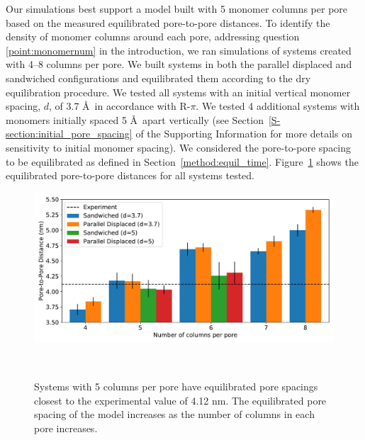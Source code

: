 \documentclass[journal=jpcbfk,manuscript=article]{achemso}
\begin{document}
  Our simulations best support a model built with 5 monomer columns per pore based on
  the measured equilibrated pore-to-pore distances. To identify the density of
  monomer columns around each pore, addressing question \ref{point:monomernum} in the introduction, we ran
  simulations of systems created with 4--8 columns per pore. We built systems in both
  the parallel displaced and sandwiched configurations and equilibrated them according
  to the dry equilibration procedure. We tested all systems with an initial vertical monomer 
  spacing, $\mathit{d}$, of 3.7 \AA~in accordance with R-$\pi$. We tested 4 additional 
  systems with monomers initially spaced 5 \AA~apart vertically (see Section~\ref{S-section:initial_pore_spacing}
  of the Supporting Information for more details on sensitivity to initial monomer spacing). 
  We considered the pore-to-pore spacing to be equilibrated as defined in Section~\ref{method:equil_time}.
  Figure~\ref{fig:p2p} shows the equilibrated pore-to-pore distances for all systems tested. 
  
  \begin{figure}[!htb]
	\centering
	\includegraphics[width=\linewidth]{p2p.pdf}
	\caption{Systems with 5 columns per pore have equilibrated pore spacings closest to
			 the experimental value of 4.12 nm. The equilibrated pore spacing of the model 	
			 increases as the number of columns in each pore increases.}~\label{fig:p2p}
  \end{figure}  
  
\end{document}
